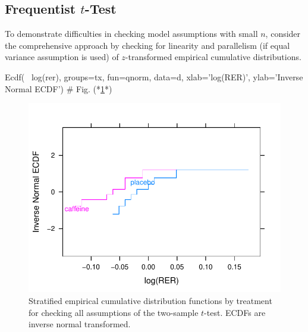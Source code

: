 \subsection{Frequentist $t$-Test}
To demonstrate difficulties in checking model assumptions with small $n$, consider the comprehensive approach by checking for linearity and parallelism (if equal variance assumption is used) of $z$-transformed empirical cumulative distributions.

\begin{Schunk}
\begin{Sinput}
Ecdf(~ log(rer), groups=tx, fun=qnorm, data=d,
     xlab='log(RER)', ylab='Inverse Normal ECDF')  # Fig. (*\ref{fig:htest-rerpass}*) 
\end{Sinput}
\begin{figure}[htbp]

\centerline{\includegraphics[width=\maxwidth]{htest-rerpass-1} }

\caption[Stratified ECDFs for checking $t$-test assumptions]{Stratified empirical cumulative distribution functions by treatment for checking all assumptions of the two-sample $t$-test.  ECDFs are inverse normal transformed.}\label{fig:htest-rerpass}
\end{figure}
\end{Schunk}

